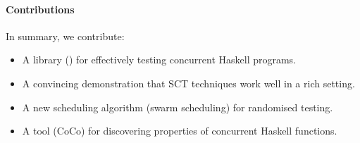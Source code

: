 \paragraph{Contributions}
In summary, we contribute:

\begin{itemize}
\item A library (\dejafu{}) for effectively testing concurrent Haskell
  programs.
\item A convincing demonstration that SCT techniques work well in a
  rich setting.
\item A new scheduling algorithm (swarm scheduling) for randomised
  testing.
\item A tool (CoCo) for discovering properties of concurrent Haskell
  functions.
\end{itemize}
